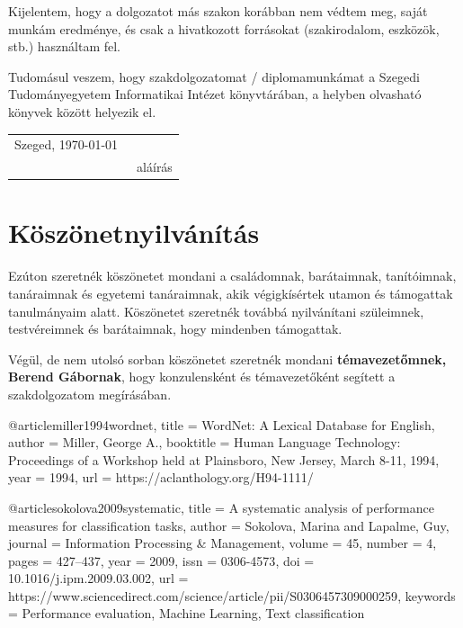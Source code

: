 \documentclass[12pt]{report}
\theoremstyle{definition}
\begin{document}
Kijelentem, hogy a dolgozatot más szakon korábban nem védtem meg, saját munkám eredménye, és csak a hivatkozott forrásokat (szakirodalom, eszközök, stb.) használtam fel.

Tudomásul veszem, hogy szakdolgozatomat / diplomamunkámat a Szegedi Tudományegyetem Informatikai Intézet könyvtárában, a helyben olvasható könyvek között helyezik el.

\vspace*{2cm}

\begin{tabular}{lc}
	Szeged, \today\
	\hspace{2cm} & \makebox[6cm]{\dotfill} \\
	             & aláírás              \\
\end{tabular}

\vspace*{4cm}




\chapter*{Köszönetnyilvánítás}

Ezúton szeretnék köszönetet mondani a családomnak, barátaimnak, tanítóimnak, tanáraimnak és egyetemi tanáraimnak, akik végigkísértek utamon és támogattak tanulmányaim alatt. Köszönetet szeretnék továbbá nyilvánítani szüleimnek, testvéreimnek és barátaimnak, hogy mindenben támogattak.

Végül, de nem utolsó sorban köszönetet szeretnék mondani \textbf{témavezetőmnek, Berend Gábornak}, hogy konzulensként és témavezetőként segített a szakdolgozatom megírásában.


%
%


@article{miller1994wordnet,
  title = {{WordNet}: A Lexical Database for {English}},
  author = {Miller, George A.},
  booktitle = {{H}uman {L}anguage {T}echnology: Proceedings of a Workshop held at {P}lainsboro, {N}ew {J}ersey, {M}arch 8-11, 1994},
  year = {1994},
  url = {https://aclanthology.org/H94-1111/}
}

@article{sokolova2009systematic,
  title = {A systematic analysis of performance measures for classification tasks},
  author = {Sokolova, Marina and Lapalme, Guy},
  journal = {Information Processing \& Management},
  volume = {45},
  number = {4},
  pages = {427--437},
  year = {2009},
  issn = {0306-4573},
  doi = {10.1016/j.ipm.2009.03.002},
  url = {https://www.sciencedirect.com/science/article/pii/S0306457309000259},
  keywords = {Performance evaluation, Machine Learning, Text classification}
}
\end{document}
